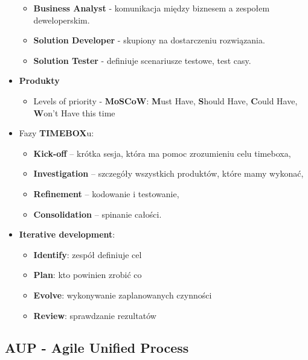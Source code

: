 \documentclass[a4paper]{article}
\begin{document}
\begin{itemize}
\begin{itemize}
            \item \textbf{Business Analyst} - komunikacja między biznesem a zespołem deweloperskim.

            \item \textbf{Solution Developer} - skupiony na dostarczeniu rozwiązania.

            \item \textbf{Solution Tester} - definiuje scenariusze testowe, test casy.
        \end{itemize}

        \item \textbf{Produkty}

        \begin{itemize}
            \item Levels of priority - \textbf{MoSCoW}: \textbf{M}ust Have,
            \textbf{S}hould Have, \textbf{C}ould Have, \textbf{W}on’t Have this time
        \end{itemize}

        \item Fazy \textbf{TIMEBOX}u:
        \begin{itemize}
            \item \textbf{Kick-off} – krótka sesja, która ma pomoc zrozumieniu celu timeboxa,
            \item \textbf{Investigation} – szczegóły wszystkich produktów, które mamy wykonać,
            \item \textbf{Refinement} – kodowanie i testowanie,
            \item \textbf{Consolidation} – spinanie całości.
        \end{itemize}

        \item \textbf{Iterative development}:
        \begin{itemize}
            \item \textbf{Identify}: zespół definiuje cel
            \item \textbf{Plan}: kto powinien zrobić co
            \item \textbf{Evolve}: wykonywanie
            zaplanowanych czynności
            \item \textbf{Review}: sprawdzanie rezultatów
        \end{itemize}

    \end{itemize}

    \subsection{AUP - Agile Unified Process}
\end{document}

